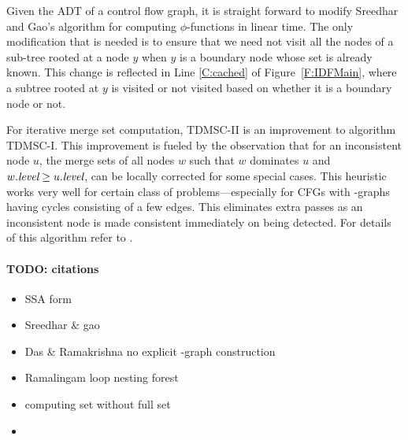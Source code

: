 {Given the ADT of a control flow graph, it is straight forward to 
modify  Sreedhar and Gao's algorithm for computing $\phi$-functions in linear time. The only modification that is needed is to ensure that we need not visit all the nodes of a sub-tree rooted at a node $y$ when $y$ is a boundary node whose \DF set is already known. This change is reflected in Line \ref{C:cached} of Figure~\ref{F:IDFMain}, where a subtree rooted at $y$ is visited or not visited based on whether it is a boundary node or not.

For iterative merge set computation, TDMSC-II is an improvement to algorithm 
TDMSC-I. This improvement is fueled by the observation that for an inconsistent 
node $u$, the merge sets of all nodes $w$ such that $w$ dominates $u$ and 
$w.\textit{level} \geq u.\textit{level}$,
can be locally corrected for some special cases. This
heuristic works very well for certain class of problems---especially for CFGs with \DF-graphs having cycles consisting of a few edges. This eliminates extra passes as an inconsistent node is made consistent immediately on being detected. For details of this algorithm refer to \cite{das}.


\paragraph{TODO: citations}
\begin{itemize}
  \item SSA form \cite{cfr}
  \item Sreedhar \& gao \cite{sreedhar_popl}
  \item Das \& Ramakrishna no explicit \DF-graph construction  \cite{das}
  \item Ramalingam loop nesting forest  \cite{rama}
  \item computing \iDF set without full \DF set \cite{sreedhar_popl,sreedharthesis}
  \item \cite{bilardi} 
\end{itemize}
}
